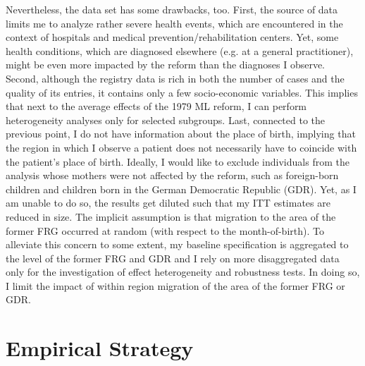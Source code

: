 \documentclass[11pt, a4paper, draft]{article} %
\begin{document}
Nevertheless, the data set has some drawbacks, too. First, the source of data limits me to analyze rather severe health events, which are encountered in the context of hospitals and medical prevention/rehabilitation centers. Yet, some health conditions, which are diagnosed elsewhere (e.g. at a general practitioner), might be even more impacted by the reform than the diagnoses I observe. %
Second, although the registry data is rich in both the number of cases and the quality of its entries, it contains only a few socio-economic variables. This implies that next to the average effects of the 1979 ML reform, I can perform heterogeneity analyses only for selected subgroups. Last, connected to the previous point, I do not have information about the place of birth, implying that the region in which I observe a patient does not necessarily have to coincide with the patient's place of birth. Ideally, I would like to exclude individuals from the analysis whose mothers were not affected by the reform, such as foreign-born children and children born in the German Democratic Republic (GDR). Yet, as I am unable to do so, the results get diluted such that my ITT estimates are reduced in size. The implicit assumption is that migration to the area of the former FRG occurred at random (with respect to the month-of-birth). To alleviate this concern to some extent, my baseline specification is aggregated to the level of the former FRG and GDR and I rely on more disaggregated data only for the investigation of effect heterogeneity and robustness tests. In doing so, I limit the impact of within region migration of the area of the former FRG or GDR.


















\bigskip
\section{Empirical Strategy}\label{sec:empirical_strategy}
\end{document}
